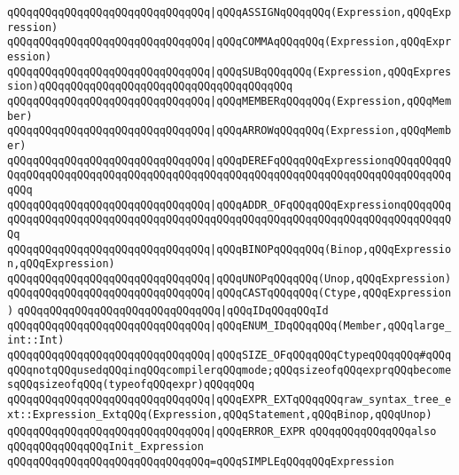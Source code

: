 \verb|qQQqqQQqqQQqqQQqqQQqqQQqqQQqqQQq|\verb#|qQQqASSIGNqQQqqQQq(Expression,qQQqExpression)#\newline
\verb|qQQqqQQqqQQqqQQqqQQqqQQqqQQqqQQq|\verb#|qQQqCOMMAqQQqqQQq(Expression,qQQqExpression)#\newline
\verb|qQQqqQQqqQQqqQQqqQQqqQQqqQQqqQQq|\verb#|qQQqSUBqQQqqQQq(Expression,qQQqExpression)qQQqqQQqqQQqqQQqqQQqqQQqqQQqqQQqqQQqqQQq#\newline
\verb|qQQqqQQqqQQqqQQqqQQqqQQqqQQqqQQq|\verb#|qQQqMEMBERqQQqqQQq(Expression,qQQqMember)#\newline
\verb|qQQqqQQqqQQqqQQqqQQqqQQqqQQqqQQq|\verb#|qQQqARROWqQQqqQQq(Expression,qQQqMember)#\newline
\verb|qQQqqQQqqQQqqQQqqQQqqQQqqQQqqQQq|\verb#|qQQqDEREFqQQqqQQqExpressionqQQqqQQqqQQqqQQqqQQqqQQqqQQqqQQqqQQqqQQqqQQqqQQqqQQqqQQqqQQqqQQqqQQqqQQqqQQqqQQqqQQq#\newline
\verb|qQQqqQQqqQQqqQQqqQQqqQQqqQQqqQQq|\verb#|qQQqADDR_OFqQQqqQQqExpressionqQQqqQQqqQQqqQQqqQQqqQQqqQQqqQQqqQQqqQQqqQQqqQQqqQQqqQQqqQQqqQQqqQQqqQQqqQQqqQQq#\newline
\verb|qQQqqQQqqQQqqQQqqQQqqQQqqQQqqQQq|\verb#|qQQqBINOPqQQqqQQq(Binop,qQQqExpression,qQQqExpression)#\newline
\verb|qQQqqQQqqQQqqQQqqQQqqQQqqQQqqQQq|\verb#|qQQqUNOPqQQqqQQq(Unop,qQQqExpression)#\newline
\verb|qQQqqQQqqQQqqQQqqQQqqQQqqQQqqQQq|\verb#|qQQqCASTqQQqqQQq(Ctype,qQQqExpression)#\newline
\verb|qQQqqQQqqQQqqQQqqQQqqQQqqQQqqQQq|\verb#|qQQqIDqQQqqQQqId#\newline
\verb|qQQqqQQqqQQqqQQqqQQqqQQqqQQqqQQq|\verb#|qQQqENUM_IDqQQqqQQq(Member,qQQqlarge_int::Int)#\newline
\verb|qQQqqQQqqQQqqQQqqQQqqQQqqQQqqQQq|\verb#|qQQqSIZE_OFqQQqqQQqCtypeqQQqqQQq#\verb|#qQQqqQQqnotqQQqusedqQQqinqQQqcompilerqQQqmode;qQQqsizeofqQQqexprqQQqbecomesqQQqsizeofqQQq(typeofqQQqexpr)qQQqqQQq|\newline
\verb|qQQqqQQqqQQqqQQqqQQqqQQqqQQqqQQq|\verb#|qQQqEXPR_EXTqQQqqQQqraw_syntax_tree_ext::Expression_ExtqQQq(Expression,qQQqStatement,qQQqBinop,qQQqUnop)#\newline
\verb|qQQqqQQqqQQqqQQqqQQqqQQqqQQqqQQq|\verb#|qQQqERROR_EXPR#\newline
\newline
\verb|qQQqqQQqqQQqqQQqalso|\newline
\verb|qQQqqQQqqQQqqQQqInit_Expression|\newline
\verb|qQQqqQQqqQQqqQQqqQQqqQQqqQQqqQQq=qQQqSIMPLEqQQqqQQqExpression|\newline
